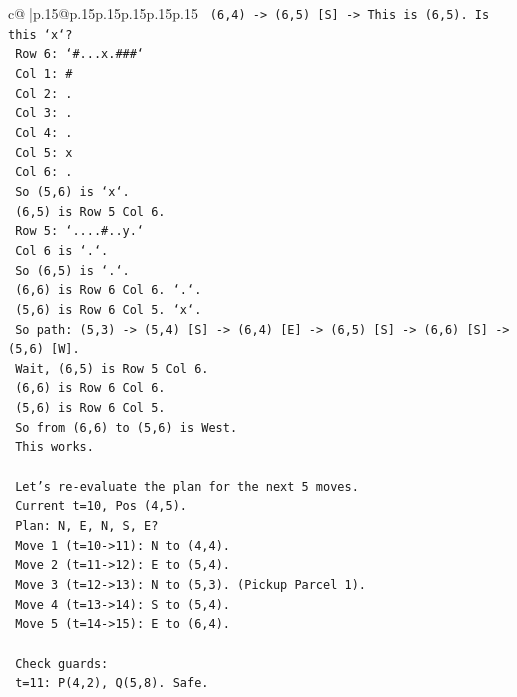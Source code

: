 \documentclass{article}
\begin{document}
{\begin{supertabular}{c@{$\;$}|p{.15\linewidth}@{}p{.15\linewidth}p{.15\linewidth}p{.15\linewidth}p{.15\linewidth}p{.15\linewidth}}
{{{\texttt{    (6,4) {-}> (6,5) {[}S{]} {-}> This is (6,5). Is this `x`?} \\
\texttt{    Row 6: `\#...x.\#\#\#`} \\
\texttt{    Col 1: \#} \\
\texttt{    Col 2: .} \\
\texttt{    Col 3: .} \\
\texttt{    Col 4: .} \\
\texttt{    Col 5: x} \\
\texttt{    Col 6: .} \\
\texttt{    So (5,6) is `x`.} \\
\texttt{    (6,5) is Row 5 Col 6.} \\
\texttt{    Row 5: `....\#..y.`} \\
\texttt{    Col 6 is `.`.} \\
\texttt{    So (6,5) is `.`.} \\
\texttt{    (6,6) is Row 6 Col 6. `.`.} \\
\texttt{    (5,6) is Row 6 Col 5. `x`.} \\
\texttt{    So path: (5,3) {-}> (5,4) {[}S{]} {-}> (6,4) {[}E{]} {-}> (6,5) {[}S{]} {-}> (6,6) {[}S{]} {-}> (5,6) {[}W{]}.} \\
\texttt{    Wait, (6,5) is Row 5 Col 6.} \\
\texttt{    (6,6) is Row 6 Col 6.} \\
\texttt{    (5,6) is Row 6 Col 5.} \\
\texttt{    So from (6,6) to (5,6) is West.} \\
\texttt{    This works.} \\
\\ 
\texttt{    Let's re{-}evaluate the plan for the next 5 moves.} \\
\texttt{    Current t=10, Pos (4,5).} \\
\texttt{    Plan: N, E, N, S, E?} \\
\texttt{    Move 1 (t=10{-}>11): N to (4,4).} \\
\texttt{    Move 2 (t=11{-}>12): E to (5,4).} \\
\texttt{    Move 3 (t=12{-}>13): N to (5,3). (Pickup Parcel 1).} \\
\texttt{    Move 4 (t=13{-}>14): S to (5,4).} \\
\texttt{    Move 5 (t=14{-}>15): E to (6,4).} \\
\\ 
\texttt{    Check guards:} \\
\texttt{    t=11: P(4,2), Q(5,8). Safe.} \\
}}}
\end{supertabular}}
\end{document}

